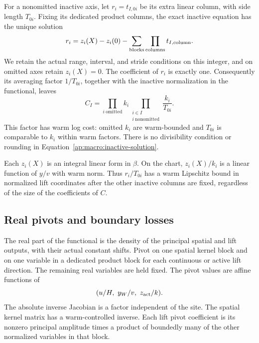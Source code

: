 For a nonomitted inactive axis, let $r_i=t_{I,0i}$ be its extra linear
column, with side length $T_{0i}$.  Fixing its dedicated product columns,
the exact inactive equation has the unique solution
\begin{equation}\label{ap:macro:inactive-solution}
 r_i=z_i(X)-z_i(0)
          -\sum_{\rm blocks}\prod_{\rm columns}t_{I,\mathrm{column}}.
\end{equation}
We retain the actual range, interval, and stride conditions on this
integer, and on omitted axes retain $z_i(X)=0$.  The coefficient of
$r_i$ is exactly one.  Consequently its averaging factor $1/T_{0i}$,
together with the inactive normalization in the functional, leaves
\begin{equation}\label{ap:macro:inactive-factor}
 C_I=\prod_{i\ \mathrm{omitted}}k_i
       \prod_{\substack{i\in I\\i\ \mathrm{nonomitted}}}
                      \frac{k_i}{T_{0i}}.
\end{equation}
This factor has warm log cost: omitted $k_i$ are warm-bounded and
$T_{0i}$ is comparable to $k_i$ within warm factors.  There is no
divisibility condition or rounding in
Equation~\eqref{ap:macro:inactive-solution}.

Each $z_i(X)$ is an integral linear form in $\beta$.  On the chart,
$z_i(X)/k_i$ is a linear function of $y/v$ with warm norm.  Thus
$r_i/T_{0i}$ has a warm Lipschitz bound in normalized lift coordinates
after the other inactive columns are fixed, regardless of the size of
the coefficients of $C$.

\subsection{Real pivots and boundary losses}

The real part of the functional is the density of the principal
spatial and lift outputs, with their actual constant shifts.  Pivot on
one spatial kernel block and on one variable in a dedicated product
block for each continuous or active lift direction.  The remaining
real variables are held fixed.  The pivot values are affine functions
of
\begin{equation}\label{ap:macro:joint-coordinates}
              (u/H,\ y_W/v,\ z_{\rm act}/k).
\end{equation}
The absolute inverse Jacobian is a factor independent of the site.
The spatial kernel matrix has a warm-controlled inverse.  Each lift
pivot coefficient is its nonzero principal amplitude times a product
of boundedly many of the other normalized variables in that block.

